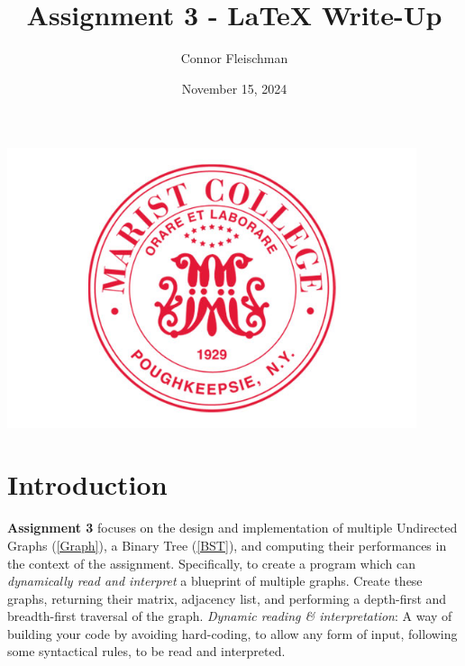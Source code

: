 \documentclass[12pt, letterpaper]{article}
\title{Assignment 3 - LaTeX Write-Up}
\author{Connor Fleischman}
\date{November 15, 2024}
\begin{document}
\maketitle
\begin{center}
   \includegraphics[width=120mm,scale=0.5]{MaristSeal.png}
\end{center}
\newpage

\tableofcontents
\newpage
\setcounter{page}{1} %

\section{Introduction}
\textbf{Assignment 3} focuses on the design and implementation of multiple Undirected Graphs (\ref{Graph}), a Binary Tree (\ref{BST}), and computing their performances in the context of the assignment.
Specifically, to create a program which can \textit{dynamically read and interpret} a blueprint of multiple graphs.
Create these graphs, returning their matrix, adjacency list, and performing a depth-first and breadth-first traversal of the graph.
\vspace*{5px}
\newline
\textit{Dynamic reading \& interpretation}: A way of building your code by avoiding hard-coding, to allow any form of input, following some syntactical rules, to be read and interpreted. 
\end{document}
